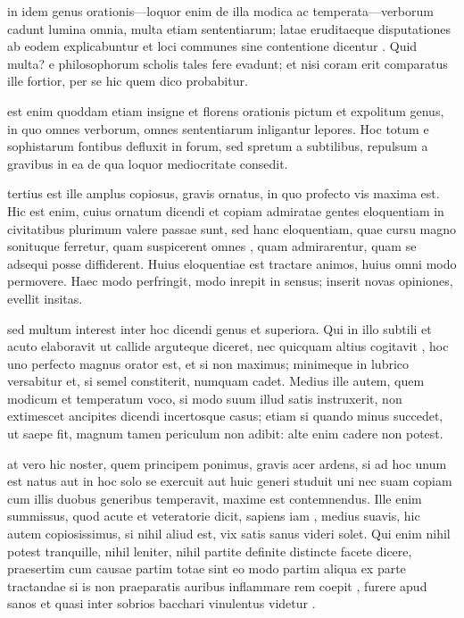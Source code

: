  in idem genus orationis—loquor enim de illa modica ac temperata—verborum cadunt lumina omnia, multa etiam sententiarum; latae eruditaeque disputationes ab eodem explicabuntur et loci communes sine contentione dicentur . Quid multa? e philosophorum scholis tales fere evadunt; et nisi coram erit comparatus ille fortior, per se hic quem dico probabitur.

 est enim quoddam etiam insigne et florens orationis pictum et expolitum genus, in quo omnes verborum, omnes sententiarum inligantur lepores. Hoc totum e sophistarum fontibus defluxit in forum, sed spretum a subtilibus, repulsum a gravibus in ea de qua loquor mediocritate consedit.

 tertius est ille amplus copiosus, gravis ornatus, in quo profecto vis maxima est. Hic est enim, cuius ornatum dicendi et copiam admiratae gentes eloquentiam in civitatibus plurimum valere passae sunt, sed hanc eloquentiam, quae cursu magno sonituque ferretur, quam suspicerent omnes , quam admirarentur, quam se adsequi posse diffiderent. Huius eloquentiae est tractare animos, huius omni modo permovere. Haec modo perfringit, modo inrepit in sensus; inserit novas opiniones, evellit insitas.

 sed multum interest inter hoc dicendi genus et superiora. Qui in illo subtili et acuto elaboravit ut callide arguteque diceret, nec quicquam altius cogitavit , hoc uno perfecto magnus orator est, et si non maximus; minimeque in lubrico versabitur et, si semel constiterit, numquam cadet. Medius ille autem, quem modicum et temperatum voco, si modo suum illud satis instruxerit, non extimescet ancipites dicendi incertosque casus; etiam si quando minus succedet, ut saepe fit, magnum tamen periculum non adibit: alte enim cadere non potest.

 at vero hic noster, quem principem ponimus, gravis acer ardens, si ad hoc unum est natus aut in hoc solo se exercuit aut huic generi studuit uni nec suam copiam cum illis duobus generibus temperavit, maxime est contemnendus. Ille enim summissus, quod acute et veteratorie dicit, sapiens iam , medius suavis, hic autem copiosissimus, si nihil aliud est, vix satis sanus videri solet. Qui enim nihil potest tranquille, nihil leniter, nihil partite definite distincte facete dicere, praesertim cum causae partim totae sint eo modo partim aliqua ex parte tractandae si is non praeparatis auribus inflammare rem coepit , furere apud sanos et quasi inter sobrios bacchari vinulentus videtur .

